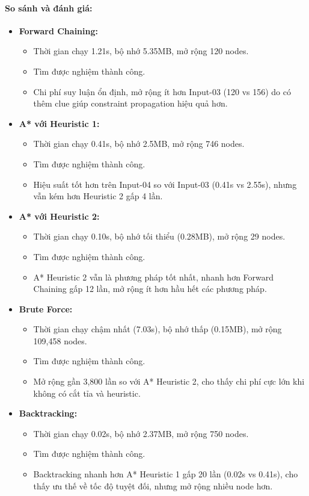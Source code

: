 \paragraph{So sánh và đánh giá:}

\begin{itemize}
\item \textbf{Forward Chaining:}
\begin{itemize}
    \item Thời gian chạy 1.21s, bộ nhớ 5.35MB, mở rộng 120 nodes.
    \item Tìm được nghiệm thành công.
    \item Chi phí suy luận ổn định, mở rộng ít hơn Input-03 (120 vs 156) do có thêm clue giúp constraint propagation hiệu quả hơn.
\end{itemize}

\item \textbf{A* với Heuristic 1:}
\begin{itemize}
    \item Thời gian chạy 0.41s, bộ nhớ 2.5MB, mở rộng 746 nodes.
    \item Tìm được nghiệm thành công.
    \item Hiệu suất tốt hơn trên Input-04 so với Input-03 (0.41s vs 2.55s), nhưng vẫn kém hơn Heuristic 2 gấp 4 lần.
\end{itemize}

\item \textbf{A* với Heuristic 2:}
\begin{itemize}
    \item Thời gian chạy 0.10s, bộ nhớ tối thiểu (0.28MB), mở rộng 29 nodes.
    \item Tìm được nghiệm thành công.
    \item A* Heuristic 2 vẫn là phương pháp tốt nhất, nhanh hơn Forward Chaining gấp 12 lần, mở rộng ít hơn hầu hết các phương pháp.
\end{itemize}

\item \textbf{Brute Force:}
\begin{itemize}
    \item Thời gian chạy chậm nhất (7.03s), bộ nhớ thấp (0.15MB), mở rộng 109,458 nodes.
    \item Tìm được nghiệm thành công.
    \item Mở rộng gần 3,800 lần so với A* Heuristic 2, cho thấy chi phí cực lớn khi không có cắt tỉa và heuristic.
\end{itemize}

\item \textbf{Backtracking:}
\begin{itemize}
    \item Thời gian chạy 0.02s, bộ nhớ 2.37MB, mở rộng 750 nodes.
    \item Tìm được nghiệm thành công.
    \item Backtracking nhanh hơn A* Heuristic 1 gấp 20 lần (0.02s vs 0.41s), cho thấy ưu thế về tốc độ tuyệt đối, nhưng mở rộng nhiều node hơn.
\end{itemize}

\end{itemize}

